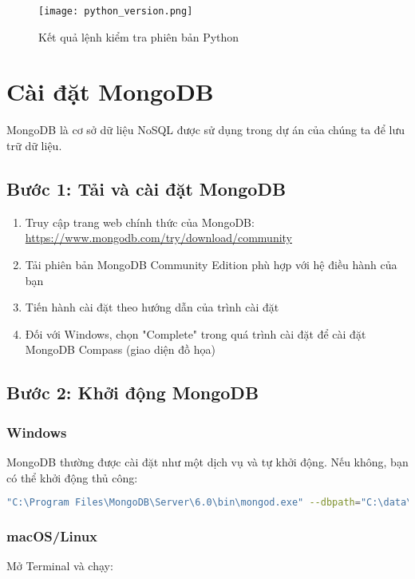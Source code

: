 \documentclass[12pt,a4paper]{article}
\begin{document}
\begin{figure}[h]
    \centering
    \texttt{[image: python\_version.png]}
    \caption{Kết quả lệnh kiểm tra phiên bản Python}
    \label{fig:python-version}
\end{figure}

\section{Cài đặt MongoDB}

MongoDB là cơ sở dữ liệu NoSQL được sử dụng trong dự án của chúng ta để lưu trữ dữ liệu.

\subsection{Bước 1: Tải và cài đặt MongoDB}

\begin{enumerate}
    \item Truy cập trang web chính thức của MongoDB: \url{https://www.mongodb.com/try/download/community}
    \item Tải phiên bản MongoDB Community Edition phù hợp với hệ điều hành của bạn
    \item Tiến hành cài đặt theo hướng dẫn của trình cài đặt
    \item Đối với Windows, chọn "Complete" trong quá trình cài đặt để cài đặt MongoDB Compass (giao diện đồ họa)
\end{enumerate}

\subsection{Bước 2: Khởi động MongoDB}

\subsubsection{Windows}
MongoDB thường được cài đặt như một dịch vụ và tự khởi động. Nếu không, bạn có thể khởi động thủ công:

\begin{lstlisting}[language=bash]
"C:\Program Files\MongoDB\Server\6.0\bin\mongod.exe" --dbpath="C:\data\db"
\end{lstlisting}

\subsubsection{macOS/Linux}
Mở Terminal và chạy:
\end{document}
